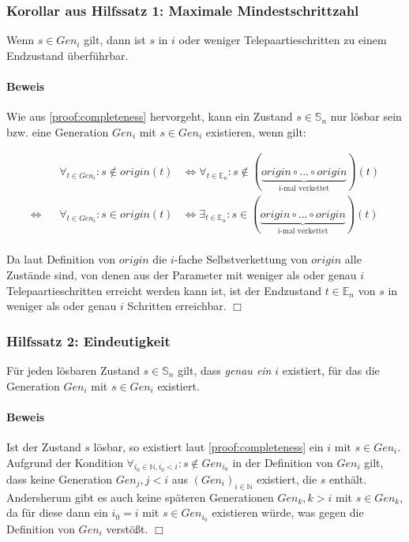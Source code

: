 \documentclass[a4paper,10pt,ngerman]{scrartcl}
\begin{document}
\subsubsection{Korollar aus Hilfssatz 1: Maximale Mindestschrittzahl} \label{proof:maxminsteps}

Wenn \(s \in Gen_i\) gilt, dann ist \(s\) in \(i\) oder weniger Telepaartieschritten zu einem Endzustand überführbar.

\paragraph{Beweis}

Wie aus \cref{proof:completeness} hervorgeht, kann ein Zustand \(s\in\mathbb{S}_n\) nur lösbar sein bzw. eine Generation \(Gen_i\) mit \(s \in Gen_i\) existieren, wenn gilt:

\begin{align*}
    &&\forall_{t \in Gen_i} : s \notin origin(t) 
    &\iff \forall_{t \in \mathbb{E}_n} : s \notin (\underbrace{origin \circ ... \circ origin}_{\text{i-mal verkettet}})(t) \\ 
    \iff&& \forall_{t \in Gen_i} : s \in origin(t) 
    &\iff \exists_{t \in \mathbb{E}_n} : s \in (\underbrace{origin \circ ... \circ origin}_{\text{i-mal verkettet}})(t) \\ 
\end{align*}

Da laut Definition von \(origin\) die \(i\)-fache Selbstverkettung von \(origin\) alle Zustände sind, von denen aus der Parameter mit weniger als oder genau \(i\) Telepaartieschritten erreicht werden kann ist, ist der Endzustand \(t \in \mathbb{E}_n\) von \(s\) in weniger als oder genau \(i\) Schritten erreichbar. \(\Box\)

\subsubsection{Hilfssatz 2: Eindeutigkeit} \label{proof:uniqueness}

Für jeden lösbaren Zustand \(s \in \mathbb{S}_n\) gilt, dass \textit{genau ein} \(i\) existiert, für das die Generation \(Gen_i\) mit \(s \in Gen_i\) existiert.

\paragraph{Beweis}

Ist der Zustand \(s\) lösbar, so existiert laut \cref{proof:completeness} ein \(i\) mit \(s \in Gen_i\). Aufgrund der Kondition \(\forall_{i_0\in\mathbb{N}, i_0 < i}: s \notin Gen_{i_0}\) in der Definition von \(Gen_i\) gilt, dass keine Generation \(Gen_j, j < i\) aus \((Gen_i)_{i\in\mathbb{N}}\) existiert, die \(s\) enthält. Andersherum gibt es auch keine späteren Generationen \(Gen_k, k > i\) mit \(s \in Gen_k\), da für diese dann ein \(i_0 = i\) mit \(s \in Gen_{i_0}\) existieren würde, was gegen die Definition von \(Gen_i\) verstößt. \(\Box\)
\end{document}
